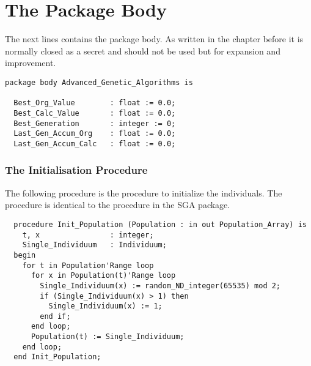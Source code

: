 \section{The Package Body}
The next lines contains the package body. As written in the chapter before
it is normally closed as a secret and should not be used but for expansion
and improvement.
\begin{verbatim}
package body Advanced_Genetic_Algorithms is

  Best_Org_Value        : float := 0.0;
  Best_Calc_Value       : float := 0.0;
  Best_Generation       : integer := 0;
  Last_Gen_Accum_Org    : float := 0.0;
  Last_Gen_Accum_Calc   : float := 0.0;
\end{verbatim}
\subsubsection{The Initialisation Procedure}
The following procedure is the procedure to initialize the individuals. The procedure
is identical to the procedure in the SGA package.
\begin{verbatim}
  procedure Init_Population (Population : in out Population_Array) is
    t, x                : integer;
    Single_Individuum   : Individuum;
  begin
    for t in Population'Range loop
      for x in Population(t)'Range loop
        Single_Individuum(x) := random_ND_integer(65535) mod 2;
        if (Single_Individuum(x) > 1) then
          Single_Individuum(x) := 1;
        end if;
      end loop;
      Population(t) := Single_Individuum;
    end loop;
  end Init_Population;
\end{verbatim}
